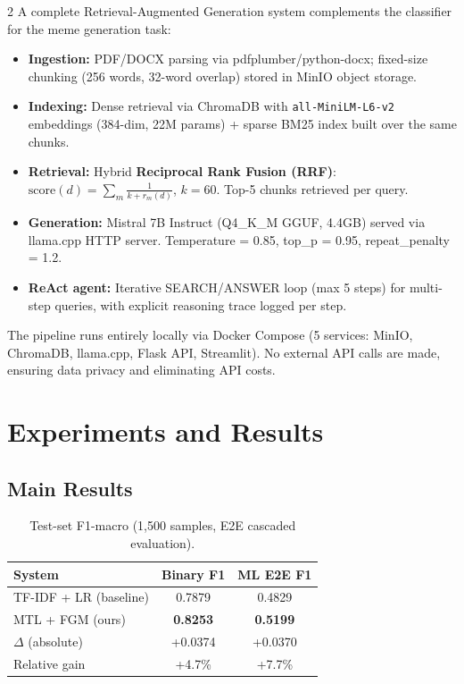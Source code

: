 \documentclass[11pt]{article}
\begin{document}
\begin{multicols}{2}
A complete Retrieval-Augmented Generation system complements the classifier for the meme generation task:

\begin{itemize}
  \item \textbf{Ingestion:} PDF/DOCX parsing via pdfplumber/python-docx; fixed-size chunking (256 words, 32-word overlap) stored in MinIO object storage.
  \item \textbf{Indexing:} Dense retrieval via ChromaDB with \texttt{all-MiniLM-L6-v2} embeddings (384-dim, 22M params) + sparse BM25 index built over the same chunks.
  \item \textbf{Retrieval:} Hybrid \textbf{Reciprocal Rank Fusion (RRF)}: $\text{score}(d) = \sum_{m} \frac{1}{k + r_m(d)}$, $k=60$. Top-5 chunks retrieved per query.
  \item \textbf{Generation:} Mistral 7B Instruct (Q4\_K\_M GGUF, 4.4GB) served via llama.cpp HTTP server. Temperature = 0.85, top\_p = 0.95, repeat\_penalty = 1.2.
  \item \textbf{ReAct agent:} Iterative SEARCH/ANSWER loop (max 5 steps) for multi-step queries, with explicit reasoning trace logged per step.
\end{itemize}

The pipeline runs entirely locally via Docker Compose (5 services: MinIO, ChromaDB, llama.cpp, Flask API, Streamlit). No external API calls are made, ensuring data privacy and eliminating API costs.

\section{Experiments and Results}

\subsection{Main Results}

\begin{table}[h]
\small
\centering
\caption{Test-set F1-macro (1{,}500 samples, E2E cascaded evaluation).}
\begin{tabular}{lcc}
\toprule
\textbf{System} & \textbf{Binary F1} & \textbf{ML E2E F1} \\
\midrule
TF-IDF + LR (baseline) & 0.7879 & 0.4829 \\
MTL + FGM (ours) & \textbf{0.8253} & \textbf{0.5199} \\
\midrule
$\Delta$ (absolute) & +0.0374 & +0.0370 \\
Relative gain & +4.7\% & +7.7\% \\
\bottomrule
\end{tabular}
\end{table}


\end{multicols}
\end{document}
